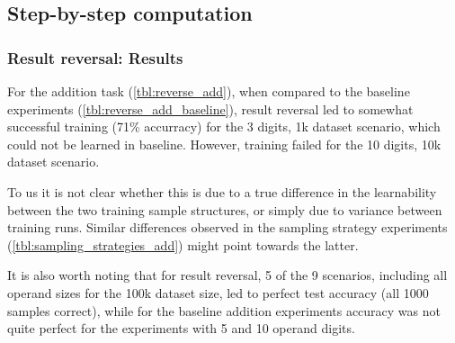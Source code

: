 \subsection{Step-by-step computation}
\label{stepbystep}



\subsubsection{Result reversal: Results}

\begin{table}[H]
	\begin{minipage}[t]{0.47\linewidth}
		\hfill
		\label{tbl:reverse_add}
	\end{minipage}
	\hfill %
	\begin{minipage}[t]{0.47\linewidth}
		\hfill
		\label{tbl:reverse_add_baseline}
	\end{minipage}
\end{table}

For the addition task (\cref{tbl:reverse_add}), when compared to the baseline experiments (\cref{tbl:reverse_add_baseline}), result reversal led to somewhat successful training (71\% accurracy) for the 3 digits, 1k dataset scenario, which could not be learned in baseline. However, training failed for the 10 digits, 10k dataset scenario.

To us it is not clear whether this is due to a true difference in the learnability between the two training sample structures, or simply due to variance between training runs. Similar differences observed in the sampling strategy experiments (\cref{tbl:sampling_strategies_add}) might point towards the latter.

It is also worth noting that for result reversal, 5 of the 9 scenarios, including all operand sizes for the 100k dataset size, led to perfect test accuracy (all 1000 samples correct), while for the baseline addition experiments accuracy was not quite perfect for the experiments with 5 and 10 operand digits.

